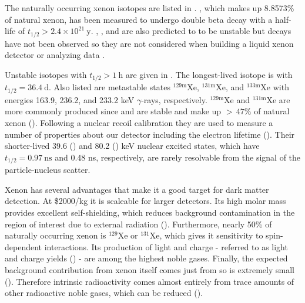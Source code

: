 The naturally occurring xenon isotopes are listed in .  , which makes up 8.8573\% of natural xenon,
has been measured to undergo double beta decay with a half-life of $t_{1/2} > 2.4 \times 10^{21}\ \mathrm{y}$.  ,
,
and  are also predicted to to be unstable but decays have not been observed so they are not considered when building a
liquid xenon detector or analyzing data .

Unstable isotopes with $t_{1/2} > 1\ \mathrm{h}$ are given in .  The longest-lived isotope is
 with $t_{1/2} = 36.4\ \mathrm{d}$.  Also listed are metastable states $\mathrm{^{129m}Xe}$, $\mathrm{^{131m}Xe}$, and
$\mathrm{^{133m}Xe}$ with energies 163.9, 236.2, and 233.2 keV $\gamma$-rays, respectively.  $\mathrm{^{129m}Xe}$ and $\mathrm{^{131m}Xe}$
are more commonly produced since  and  are stable and make up ${>}\, 47\%$ of natural xenon
().  Following a nuclear recoil calibration they are used to measure a number of properties about our detector
including the electron lifetime ().  Their shorter-lived 39.6
() and 80.2 () keV nuclear
excited states, which have $t_{1/2} = 0.97\ \mathrm{ns}$ and 0.48 ns, respectively, are rarely resolvable from the signal of the
particle-nucleus scatter.

Xenon has several advantages that make it a good target for dark matter detection.  At \$2000/kg it is scaleable for larger
detectors.  Its high molar mass provides excellent self-shielding, which reduces background contamination in the region of interest due to
external radiation
().  Furthermore, nearly 50\% of naturally occurring xenon is $^{129}$Xe or $^{131}$Xe,
which gives it sensitivity to spin-dependent interactions.  Its production of light and charge - referred to as light and charge yields
() - are among the highest noble gases.  Finally, the expected background contribution
from xenon itself comes just from  so is extremely small ().  Therefore
intrinsic radioactivity comes almost entirely from trace amounts of other radioactive noble gases, which can be reduced
().


